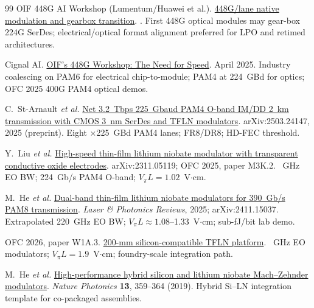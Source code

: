 \begin{thebibliography}{99}
OIF 448G AI Workshop (Lumentum/Huawei et al.).
\newblock \href{https://www.oiforum.com/wp-content/uploads/OIF-448G-AI-Workshop-Huawei-Kuschnerov_Matuz.pdf}{448G/lane native modulation and gearbox transition}.
.
\newblock First 448G optical modules may gear-box 224G SerDes; electrical/optical
format alignment preferred for LPO and retimed architectures.

Cignal AI.
\newblock \href{https://cignal.ai/2025/04/oifs-448g-workshop-the-need-for-speed/}{OIF's 448G Workshop: The Need for Speed}.
\newblock April 2025.
\newblock Industry coalescing on PAM6 for electrical chip-to-module; PAM4 at
224~GBd for optics; OFC 2025 400G PAM4 optical demos.

C.~St-Arnault \emph{et al.}
\newblock \href{https://arxiv.org/html/2503.24147}{Net 3.2~Tbps 225~Gbaud PAM4 O-band IM/DD 2~km transmission with CMOS 3~nm SerDes and TFLN modulators}.
\newblock arXiv:2503.24147, 2025 (preprint).
\newblock Eight $\times$225~GBd PAM4 lanes; FR8/DR8; HD-FEC threshold.

Y.~Liu \emph{et al.}
\newblock \href{https://arxiv.org/abs/2311.05119}{High-speed thin-film lithium niobate modulator with transparent conductive oxide electrodes}.
\newblock arXiv:2311.05119; OFC 2025, paper M3K.2.
~GHz EO BW; 224~Gb/s PAM4 O-band; $V_\pi L=1.02$~V$\cdot$cm.

M.~He \emph{et al.}
\newblock \href{https://arxiv.org/abs/2411.15037}{Dual-band thin-film lithium niobate modulators for 390~Gb/s PAM8 transmission}.
\newblock \emph{Laser \& Photonics Reviews}, 2025; arXiv:2411.15037.
\newblock Extrapolated 220~GHz EO BW; $V_\pi L\approx1.08$--1.33~V$\cdot$cm; sub-fJ/bit lab demo.

OFC 2026, paper W1A.3.
\newblock \href{https://doi.org/10.1364/OFC.2026.W1A.3}{200-mm silicon-compatible TFLN platform}.
~GHz EO modulators; $V_\pi L=1.9$~V$\cdot$cm; foundry-scale integration path.

M.~He \emph{et al.}
\newblock \href{https://doi.org/10.1038/s41566-019-0378-6}{High-performance hybrid silicon and lithium niobate Mach--Zehnder modulators}.
\newblock \emph{Nature Photonics} \textbf{13}, 359--364 (2019).
\newblock Hybrid Si--LN integration template for co-packaged assemblies.


\end{thebibliography}
